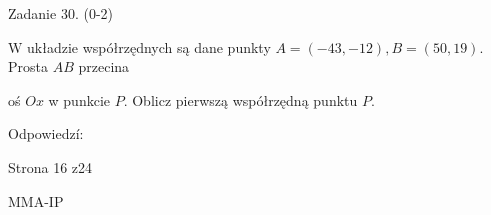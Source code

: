 \documentclass[a4paper,12pt]{article}
\begin{document}
Zadanie 30. (0-2)

$\mathrm{W}$ układzie współrzędnych są dane punkty $A=(-43,-12), B=(50,19)$. Prosta $AB$ przecina

oś $Ox$ w punkcie $P$. Oblicz pierwszą współrzędną punktu $P.$

Odpowiedzí:

Strona 16 z24

MMA-IP
\end{document}
